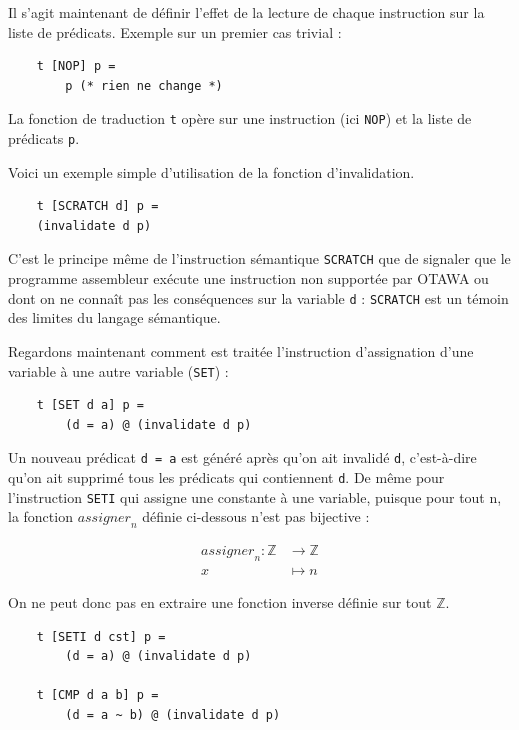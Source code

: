 \documentclass[french]{article}
\begin{document}
  \bigbreak

  Il s'agit maintenant de définir l'effet de la lecture de chaque instruction sur la liste de prédicats.
  Exemple sur un premier cas trivial :

  \begin{lstlisting}
    t [NOP] p =
        p (* rien ne change *)
  \end{lstlisting}

  La fonction de traduction \texttt{t} opère sur une instruction (ici \texttt{NOP}) et la liste de prédicats \texttt{p}.
  
  Voici un exemple simple d'utilisation de la fonction d'invalidation.
  
  \begin{lstlisting}
    t [SCRATCH d] p =
	(invalidate d p)
  \end{lstlisting}
  
  C'est le principe même de l'instruction sémantique \texttt{SCRATCH} que de signaler que le programme assembleur exécute une instruction non supportée par OTAWA ou dont on ne connaît pas les conséquences sur la variable \texttt{d} : \texttt{SCRATCH} est un témoin des limites du langage sémantique.

  Regardons maintenant comment est traitée l'instruction d'assignation d'une variable à une autre variable (\texttt{SET}) :

  \begin{lstlisting}
    t [SET d a] p =
        (d = a) @ (invalidate d p)
  \end{lstlisting}

  Un nouveau prédicat \texttt{d = a} est généré après qu'on ait invalidé \texttt{d}, c'est-à-dire qu'on ait supprimé tous les prédicats qui contiennent \texttt{d}.
  De même pour l'instruction \texttt{SETI} qui assigne une constante à une variable, puisque pour tout n, la fonction $\textit{assigner}_n$ définie ci-dessous n'est pas bijective :

  \begin{align*}
    \textit{assigner}_n : \mathds{Z} &\rightarrow \mathds{Z}\\
    x &\mapsto n
  \end{align*}

  On ne peut donc pas en extraire une fonction inverse définie sur tout $\mathds{Z}$.

  \begin{lstlisting}
    t [SETI d cst] p =
        (d = a) @ (invalidate d p)

    t [CMP d a b] p =
        (d = a ~ b) @ (invalidate d p)
    \end{lstlisting}
\end{document}
